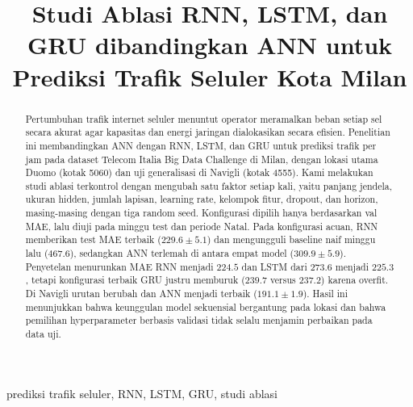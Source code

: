 \documentclass[conference,a4paper]{IEEEtran}
\begin{document}
\title{Studi Ablasi RNN, LSTM, dan GRU dibandingkan ANN untuk Prediksi Trafik Seluler Kota Milan}

\author{
\and
{}
\and
{}
}

\maketitle

\begin{abstract}
Pertumbuhan trafik internet seluler menuntut operator meramalkan beban setiap sel secara akurat agar kapasitas dan energi jaringan dialokasikan secara efisien. Penelitian ini membandingkan ANN dengan RNN, LSTM, dan GRU untuk prediksi trafik per jam pada dataset Telecom Italia Big Data Challenge di Milan, dengan lokasi utama Duomo (kotak 5060) dan uji generalisasi di Navigli (kotak 4555). Kami melakukan studi ablasi terkontrol dengan mengubah satu faktor setiap kali, yaitu panjang jendela, ukuran hidden, jumlah lapisan, learning rate, kelompok fitur, dropout, dan horizon, masing-masing dengan tiga random seed. Konfigurasi dipilih hanya berdasarkan val MAE, lalu diuji pada minggu test dan periode Natal. Pada konfigurasi acuan, RNN memberikan test MAE terbaik ($229.6 \pm 5.1$) dan mengungguli baseline naif minggu lalu ($467.6$), sedangkan ANN terlemah di antara empat model ($309.9 \pm 5.9$). Penyetelan menurunkan MAE RNN menjadi $224.5$ dan LSTM dari $273.6$ menjadi $225.3$, tetapi konfigurasi terbaik GRU justru memburuk ($239.7$ versus $237.2$) karena overfit. Di Navigli urutan berubah dan ANN menjadi terbaik ($191.1 \pm 1.9$). Hasil ini menunjukkan bahwa keunggulan model sekuensial bergantung pada lokasi dan bahwa pemilihan hyperparameter berbasis validasi tidak selalu menjamin perbaikan pada data uji.
\end{abstract}

\begin{IEEEkeywords}
prediksi trafik seluler, RNN, LSTM, GRU, studi ablasi
\end{IEEEkeywords}
\end{document}
